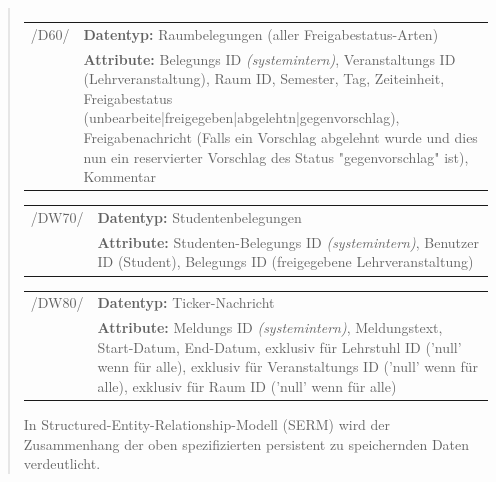 \begin{quote}
\begin{tabular}{p{1.5cm}p{14.5cm}}
\end{tabular}


\begin{tabular}{p{1.5cm}p{14.5cm}}
					
	 /D60/	& \textbf{Datentyp:} Raumbelegungen (aller Freigabestatus-Arten) \\
				& \textbf{Attribute:} Belegungs ID \textsl{(systemintern)}, Veranstaltungs ID (Lehrveranstaltung), Raum ID, Semester, Tag, Zeiteinheit, Freigabestatus (unbearbeite|freigegeben|abgelehtn|gegenvorschlag), Freigabenachricht (Falls ein Vorschlag abgelehnt wurde und dies nun ein reservierter Vorschlag des Status "gegenvorschlag" ist), Kommentar  \\[0.25cm]

\end{tabular}


\begin{tabular}{p{1.5cm}p{14.5cm}}
		
	 /DW70/& \textbf{Datentyp:} Studentenbelegungen \\
				& \textbf{Attribute:} Studenten-Belegungs ID \textsl{(systemintern)}, Benutzer ID (Student), Belegungs ID (freigegebene Lehrveranstaltung) \\[0.25cm]

\end{tabular}


\begin{tabular}{p{1.5cm}p{14.5cm}}
					
	 /DW80/& \textbf{Datentyp:} Ticker-Nachricht \\
				& \textbf{Attribute:} Meldungs ID \textsl{(systemintern)}, Meldungstext, Start-Datum, End-Datum, exklusiv für Lehrstuhl ID ('null' wenn für alle), exklusiv für Veranstaltungs ID ('null' wenn für alle), exklusiv für Raum ID ('null' wenn für alle) \\[0.25cm]
		
\end{tabular}


In Structured-Entity-Relationship-Modell (SERM) wird der Zusammenhang der oben spezifizierten persistent zu speichernden Daten verdeutlicht. \\


\end{quote}
